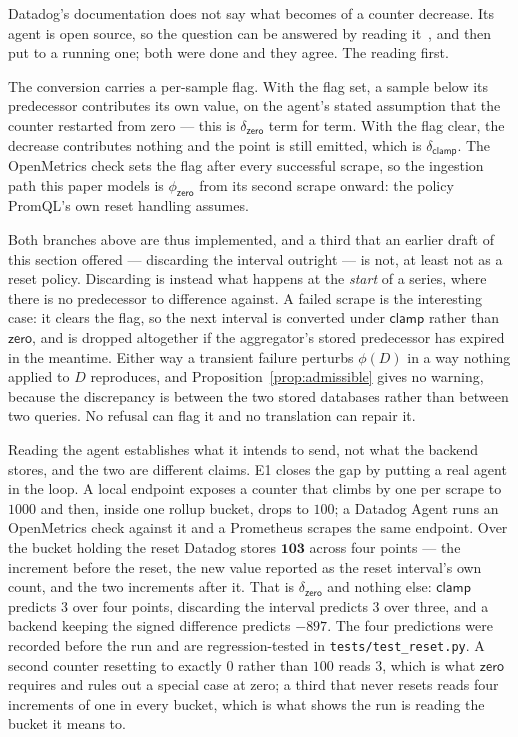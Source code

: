 \begin{remark}\label{rem:rho}
Datadog's documentation does not say what becomes of a counter decrease. Its agent is
open source, so the question can be answered by reading it~\citep{ddagent}, and then put
to a running one; both were done and they agree. The reading first.

The conversion carries a per-sample flag. With the flag set, a
sample below its predecessor contributes its own value, on the agent's stated assumption
that the counter restarted from zero --- this is $\delta_{\mathsf{zero}}$ term for term.
With the flag clear, the decrease contributes nothing and the point is still emitted,
which is $\delta_{\mathsf{clamp}}$. The OpenMetrics check sets the flag after every
successful scrape, so the ingestion path this paper models is $\phi_{\mathsf{zero}}$ from
its second scrape onward: the policy PromQL's own reset handling assumes.

Both branches above are thus implemented, and a third that an earlier draft of this
section offered --- discarding the interval outright --- is not, at least not as a reset
policy. Discarding is instead what happens at the \emph{start} of a series, where there is
no predecessor to difference against. A failed scrape is the interesting case: it clears
the flag, so the next interval is converted under $\mathsf{clamp}$ rather than
$\mathsf{zero}$, and is dropped altogether if the aggregator's stored predecessor has
expired in the meantime. Either way a transient failure perturbs $\phi(D)$ in a way
nothing applied to $D$ reproduces, and Proposition~\ref{prop:admissible} gives no warning,
because the discrepancy is between the two stored databases rather than between two
queries. No refusal can flag it and no translation can repair it.

Reading the agent establishes what it intends to send, not what the backend stores, and
the two are different claims. E1 closes the gap by putting a real agent in the loop. A
local endpoint exposes a counter that climbs by one per scrape to $1000$ and then, inside
one rollup bucket, drops to $100$; a Datadog Agent runs an OpenMetrics check against it
and a Prometheus scrapes the same endpoint. Over the bucket holding the reset Datadog
stores $\mathbf{103}$ across four points --- the increment before the reset, the new
value reported as the reset interval's own count, and the two increments after it. That
is $\delta_{\mathsf{zero}}$ and nothing else: $\mathsf{clamp}$ predicts $3$ over four
points, discarding the interval predicts $3$ over three, and a backend keeping the signed
difference predicts $-897$. The four predictions were recorded before the run and are
regression-tested in \texttt{tests\slash test\_reset.py}. A second counter resetting to
exactly $0$ rather than $100$ reads $3$, which is what $\mathsf{zero}$ requires and rules
out a special case at zero; a third that never resets reads four increments of one in
every bucket, which is what shows the run is reading the bucket it means to.
\end{remark}
